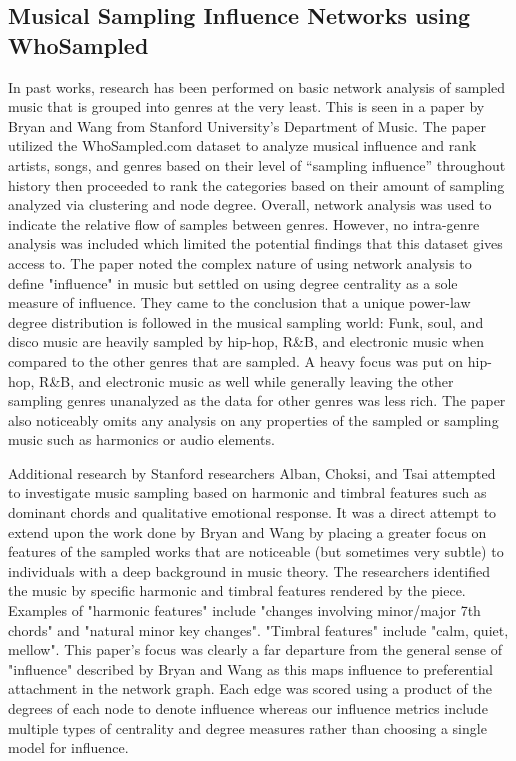 \documentclass[pageno]{jpaper}
\begin{document}
\subsection{Musical Sampling Influence Networks using WhoSampled}
In past works, research has been performed on basic network analysis of sampled music that is grouped into genres at the very least. This is seen in
a paper by Bryan and Wang from Stanford University’s Department of Music. \cite{Bryan} The paper utilized the WhoSampled.com dataset to analyze musical influence and rank artists, songs, and genres based on their level of “sampling influence” throughout history then proceeded to rank the categories based on their amount of sampling analyzed via clustering and node degree. Overall, network analysis was used to indicate the relative flow of samples between genres. However, no intra-genre analysis was included which limited the potential findings that this dataset gives access to. The paper noted the complex nature of using network analysis to define "influence" in music but settled on using degree centrality as a sole measure of influence. They came to the conclusion that a unique power-law degree distribution is followed in the musical sampling world: Funk, soul, and disco music are heavily sampled by hip-hop, R\&B, and electronic music when compared to the other genres that are sampled. A heavy focus was put on hip-hop, R\&B, and electronic music as well while generally leaving the other sampling genres unanalyzed as the data for other genres was less rich. The paper also noticeably omits any analysis on any properties of the sampled or sampling music such as harmonics or audio elements. 

Additional research by Stanford researchers Alban, Choksi, and Tsai attempted to investigate music sampling based on harmonic and timbral features such as dominant chords and qualitative emotional response. \cite{Alban} It was a direct attempt to extend upon the work done by Bryan and Wang by placing a greater focus on features of the sampled works that are noticeable (but sometimes very subtle) to individuals with a deep background in music theory. The researchers identified the music by specific harmonic and timbral features rendered by the piece. Examples of "harmonic features" include "changes involving minor/major 7th chords" and "natural minor key changes". "Timbral features" include "calm, quiet, mellow". This paper's focus was clearly a far departure from the general sense of "influence" described by Bryan and Wang as this maps influence to preferential attachment in the network graph. Each edge was scored using a product of the degrees of each node to denote influence whereas our influence metrics include multiple types of centrality and degree measures rather than choosing a single model for influence. 
\end{document}
